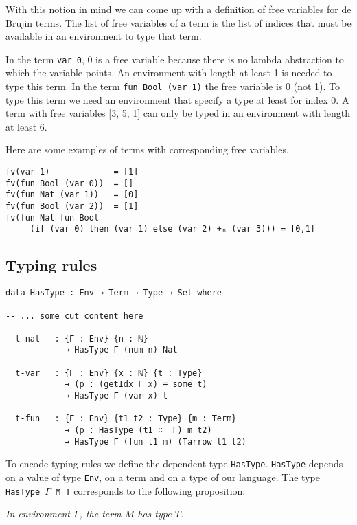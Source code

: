 \documentclass{article}
\begin{document}
With this notion in mind we can come up with a definition of free variables for de Brujin terms.
The list of free variables of a term is the list of indices that must be available in an environment to type that term.

In the term \texttt{var 0}, 0 is a free variable because there is no lambda abstraction to which the variable points.
An environment with length at least 1 is needed to type this term.
In the term \texttt{fun Bool (var 1)} the free variable is 0 (not 1).
To type this term we need an environment that specify a type at least for index 0.
A term with free variables [3, 5, 1] can only be typed in an environment with length at least 6.

Here are some examples of terms with corresponding free variables.

\begin{verbatim}
fv(var 1)             = [1]
fv(fun Bool (var 0))  = []
fv(fun Nat (var 1))   = [0]
fv(fun Bool (var 2))  = [1]
fv(fun Nat fun Bool
     (if (var 0) then (var 1) else (var 2) +ₙ (var 3))) = [0,1]
\end{verbatim}


\subsection*{Typing rules}

\begin{verbatim}
data HasType : Env → Term → Type → Set where

-- ... some cut content here

  t-nat   : {Γ : Env} {n : ℕ}
            → HasType Γ (num n) Nat

  t-var   : {Γ : Env} {x : ℕ} {t : Type}
            → (p : (getIdx Γ x) ≡ some t)
            → HasType Γ (var x) t
            
  t-fun   : {Γ : Env} {t1 t2 : Type} {m : Term}
            → (p : HasType (t1 ∷  Γ) m t2)
            → HasType Γ (fun t1 m) (Tarrow t1 t2)
\end{verbatim}

To encode typing rules we define the dependent type \texttt{HasType}.
\texttt{HasType} depends on a value of type \texttt{Env}, on a term and on a type of our language.
The type \texttt{HasType $\Gamma$ M T} corresponds to the following proposition:

\vspace{1em}
\textit{In environment $\Gamma$, the term $M$ has type $T$.}
\vspace{1em}
\end{document}
